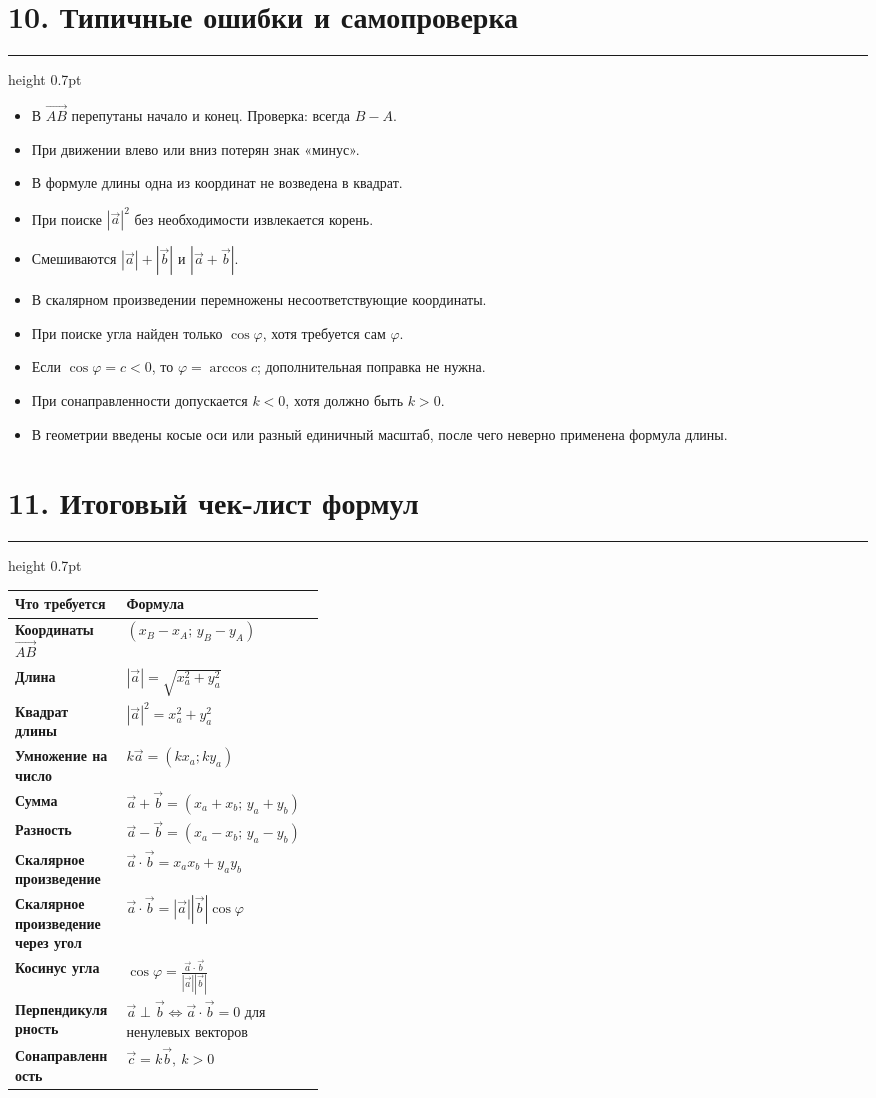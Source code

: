 \documentclass[a4paper,12pt]{article}
\newcommand{\vect}[1]{\vec{#1}}
\newcommand{\checkitem}{\item[$\square$]}
\newcommand{\sectionrule}{%
  \par\vspace{1mm}%
  {\color{accent!60}\hrule height 0.7pt}%
  \vspace{3mm}%
}
\begin{document}
\section*{10. Типичные ошибки и самопроверка}
\sectionrule

\begin{itemize}[leftmargin=7mm,itemsep=2mm]
\checkitem В \(\overrightarrow{AB}\) перепутаны начало и конец. Проверка: всегда \(B-A\).
\checkitem При движении влево или вниз потерян знак «минус».
\checkitem В формуле длины одна из координат не возведена в квадрат.
\checkitem При поиске \(|\vect a|^2\) без необходимости извлекается корень.
\checkitem Смешиваются \(|\vect a|+|\vect b|\) и \(|\vect a+\vect b|\).
\checkitem В скалярном произведении перемножены несоответствующие координаты.
\checkitem При поиске угла найден только \(\cos\varphi\), хотя требуется сам \(\varphi\).
\checkitem Если \(\cos\varphi=c<0\), то \(\varphi=\arccos c\); дополнительная поправка не нужна.
\checkitem При сонаправленности допускается \(k<0\), хотя должно быть \(k>0\).
\checkitem В геометрии введены косые оси или разный единичный масштаб, после чего неверно применена формула длины.
\end{itemize}

\clearpage
\section*{11. Итоговый чек-лист формул}
\sectionrule

\begin{table}[h!]
\centering
\begin{tabularx}{\linewidth}{@{}>{\bfseries}p{0.36\linewidth}X@{}}
\toprule
Что требуется & Формула \\
\midrule
Координаты \(\overrightarrow{AB}\)
& \((x_B-x_A;\,y_B-y_A)\) \\[1.5mm]
Длина
& \(|\vect a|=\sqrt{x_a^2+y_a^2}\) \\[1.5mm]
Квадрат длины
& \(|\vect a|^2=x_a^2+y_a^2\) \\[1.5mm]
Умножение на число
& \(k\vect a=(kx_a;ky_a)\) \\[1.5mm]
Сумма
& \(\vect a+\vect b=(x_a+x_b;\,y_a+y_b)\) \\[1.5mm]
Разность
& \(\vect a-\vect b=(x_a-x_b;\,y_a-y_b)\) \\[1.5mm]
Скалярное произведение
& \(\vect a\cdot\vect b=x_ax_b+y_ay_b\) \\[1.5mm]
Скалярное произведение через угол
& \(\vect a\cdot\vect b=|\vect a||\vect b|\cos\varphi\) \\[1.5mm]
Косинус угла
& \(\displaystyle \cos\varphi=\frac{\vect a\cdot\vect b}{|\vect a||\vect b|}\) \\[2mm]
Перпендикулярность
& \(\vect a\perp\vect b\iff\vect a\cdot\vect b=0\) для ненулевых векторов \\[1.5mm]
Сонаправленность
& \(\vect c=k\vect b,\ k>0\) \\
\bottomrule
\end{tabularx}
\end{table}
\end{document}
